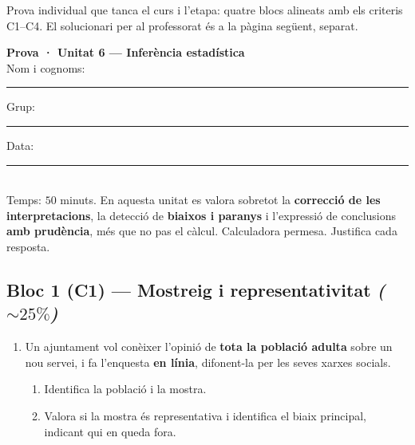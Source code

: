 %
{Prova individual que tanca el curs i l'etapa: quatre blocs alineats amb els criteris C1–C4. El solucionari per al professorat és a la pàgina següent, separat.}

\begin{tcolorbox}[colback=white, colframe=udnavy, boxrule=0.8pt, arc=2pt,
  left=8pt, right=8pt, top=6pt, bottom=6pt]
\textbf{Prova · Unitat 6 — Inferència estadística}\\[4pt]
Nom i cognoms: \rule{6.5cm}{0.4pt} \quad Grup: \rule{1.6cm}{0.4pt} \quad Data: \rule{2.2cm}{0.4pt}\\[6pt]
\small Temps: $50$ minuts. En aquesta unitat es valora sobretot la \textbf{correcció de les
interpretacions}, la detecció de \textbf{biaixos i paranys} i l'expressió de conclusions
\textbf{amb prudència}, més que no pas el càlcul. Calculadora permesa. Justifica cada
resposta.
\end{tcolorbox}

\vspace{0.4em}

\subsection*{Bloc 1 (C1) — Mostreig i representativitat \hfill \normalfont\itshape ($\sim 25\%$)}

\begin{enumerate}[label=\textbf{\arabic*.}, leftmargin=2em, itemsep=7pt]
  \item Un ajuntament vol conèixer l'opinió de \textbf{tota la població adulta} sobre un nou
        servei, i fa l'enquesta \textbf{en línia}, difonent-la per les seves xarxes socials.
        \begin{enumerate}[label=\alph*), leftmargin=1.6em, topsep=2pt, itemsep=2pt]
          \item Identifica la població i la mostra.
          \item Valora si la mostra és representativa i identifica el biaix principal,
                indicant qui en queda fora.
        \end{enumerate}
\end{enumerate}

